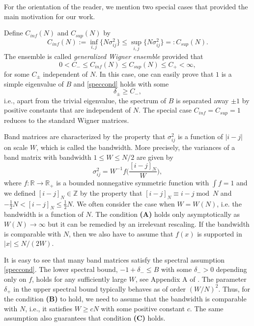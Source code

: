\documentclass[draft]{article}
\newcommand{\bR}{{\mathbb R}}
\newcommand{\bZ}{{\mathbb Z}}
\newcommand{\be}{\begin{equation}}
\newcommand{\ee}{\end{equation}}
\newcommand{\Ci}{{ C_{inf}}}
\newcommand{\Cs}{{ C_{sup}}}
\numberwithin{equation}{section}
\numberwithin{theorem}{section}
\numberwithin{definition}{section}
\numberwithin{remark}{section}
\begin{document}
For the orientation of the reader, we  mention two special cases  that provided the main motivation
for our work.


 

\bigskip

  Define $\Ci(N)$ and $\Cs(N)$ by
\be\label{defCiCs}
      \Ci(N):= \inf_{i,j}\{N\sigma^2_{ij}\}\leq \sup_{ i,j}\{N\sigma^2_{ij}\}=:\Cs(N).
\ee
The ensemble is called  {\it generalized Wigner ensemble} provided that 
\be\label{VV}
	0<C_-\le \Ci(N)\leq \Cs (N) \le C_+ <\infty,
\ee
for some $C_\pm$ independent of $N$. 
In this case, one can easily prove that $1$ is a simple eigenvalue of $B$
and \eqref{speccond} holds with some
\be\label{de-de+2}
	\delta_\pm\ge C_-,
\ee 
i.e., apart from the trivial eigenvalue, the spectrum of $B$ is separated away $\pm 1$
by  positive constants that are independent of $N$. 
The special case  $\Ci=\Cs=1$ reduces  to the standard Wigner matrices.


\bigskip

Band matrices are characterized by the property that $\sigma_{ij}^2$ is
a function of $|i-j|$ on scale $W$, which is called the bandwidth. 
 More precisely, the variances of a band matrix with bandwidth $1\le W\le N/2$ are given by 
\be\label{BM}
   \sigma^2_{ij} = W^{-1} f\Big(\frac{ [i-j]_N}{W}\Big),
\ee
where  $f:\bR\to \bR_+$ is a bounded nonnegative symmetric function with 
$\int f =1$ 
and we defined $[i-j]_N\in\bZ$  by the property
that  $[i-j]_N\equiv i-j \; \mbox{mod}\,\,\, N$ and
$-\frac{1}{2}N < [i-j]_N \le\frac{1}{2}N $.
We often consider the case when $W=W(N)$, i.e. the bandwidth is a function of $N$.
The condition {\bf (A)} holds only asymptotically as $W(N)\to\infty$ 
but it can be remedied by an irrelevant rescaling. If the bandwidth is
comparable with $N$, then we also have to assume that $f(x)$ is supported in $|x|\le N/(2W)$.


It is easy to see that many band matrices satisfy the spectral
 assumption \eqref{speccond}. The lower spectral bound, $-1+\delta_-\le B$ with  some
$\delta_->0$ depending only on $f$, holds for any sufficiently large $W$, see Appendix A
of \cite{ESYY}.   The parameter $\delta_+$ in the upper spectral bound typically 
behaves as of order $(W/N)^2$. Thus, for the condition {\bf (B)} to hold,
we need to assume that the bandwidth is comparable with $N$, i.e.,
it satisfies $W\ge cN$ with some positive constant $c$.
The same assumption  also guarantees that condition {\bf (C)}  holds.
\end{document}
